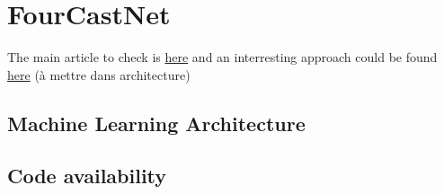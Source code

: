\section{FourCastNet}

The main article to check is  \href{https://arxiv.org/pdf/2202.11214.pdf}{here} and  an interresting approach could be found \href{Spherical Fourier Neural Operators: Learning Stable Dynamics on the Sphere}{here} (à mettre dans architecture)
\subsection{Machine Learning Architecture}
\subsection{Code availability }